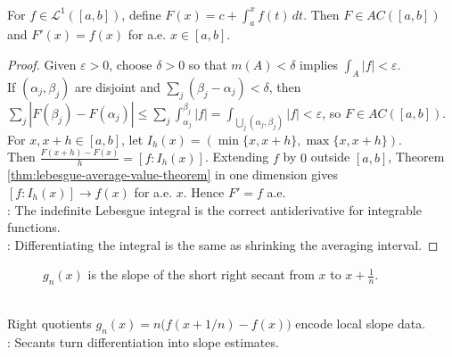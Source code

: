 \begin{theorem} \label{thm:lebesgue-antiderivative-theorem} \\
For $f\in\mathscr{L}^1([a,b])$, define $F(x)=c+\int_a^x f(t)\,dt$. Then $F\in AC([a,b])$ and $F'(x)=f(x)$ for a.e. $x\in[a,b]$.
\begin{proof}
Given $\varepsilon>0$, choose $\delta>0$ so that $m(A)<\delta$ implies $\int_A|f|<\varepsilon$.\\
If $(\alpha_j,\beta_j)$ are disjoint and $\sum_j(\beta_j-\alpha_j)<\delta$, then $\sum_j|F(\beta_j)-F(\alpha_j)| \le \sum_j\int_{\alpha_j}^{\beta_j}|f| =\int_{\bigcup_j(\alpha_j,\beta_j)}|f| <\varepsilon$, so $F\in AC([a,b])$. For $x,x+h\in[a,b]$, let $I_h(x)=(\min\{x,x+h\},\max\{x,x+h\})$.\\
Then $\frac{F(x+h)-F(x)}{h}=[f:I_h(x)]$. Extending $f$ by $0$ outside $[a,b]$, Theorem \ref{thm:lebesgue-average-value-theorem} in one dimension gives $[f:I_h(x)]\to f(x)$ for a.e. $x$. Hence $F'=f$ a.e.\\
: The indefinite Lebesgue integral is the correct antiderivative for integrable functions.\\
: Differentiating the integral is the same as shrinking the averaging interval.
\end{proof}
\end{theorem}

\begin{figure}[H]
  \centering
  
  \caption{$g_n(x)$ is the slope of the short right secant from $x$ to $x+\frac1n$.}
  \label{fig:lebesgue-right-secants}
\end{figure}

\begin{perspective} \label{per:lebesgue-right-secants} \\
Right quotients $g_n(x)=n\bigl(f(x+1/n)-f(x)\bigr)$ encode local slope data.\\
: Secants turn differentiation into slope estimates.
\end{perspective}

